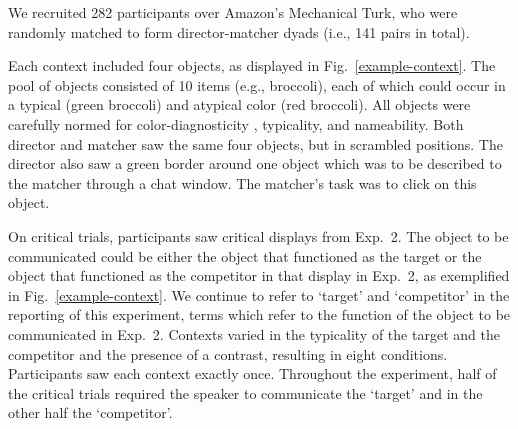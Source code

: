 \documentclass[10pt,letterpaper]{article}
\newcommand{\figref}[1]{Fig.~\ref{#1}}
\begin{document}


We recruited 282 participants over Amazon's Mechanical Turk, who were randomly matched to form director-matcher dyads (i.e., 141 pairs in total). 

Each context included four objects, as displayed in \figref{example-context}. The pool of objects consisted of 10 items (e.g., broccoli), each of which could occur in a typical (green broccoli) and atypical color (red broccoli). All objects were carefully normed for color-diagnosticity \cite{Tanaka:1999}, typicality, and nameability. Both director and matcher saw the same four objects, but in scrambled positions. The director also saw a green border around one object which was to be described to the matcher through a chat window. The matcher's task was to click on this object. 


On critical trials, participants saw critical displays from Exp.~2. The object to be communicated could be either the object that functioned as the target or the object that functioned as the competitor in that display in Exp.~2, as exemplified in \figref{example-context}. We continue to refer to `target' and `competitor' in the reporting of this experiment, terms which refer to the function of the object to be communicated in Exp.~2. Contexts varied in the typicality of the target and the competitor and the presence of a contrast, resulting in eight conditions. Participants saw each context exactly once. Throughout the experiment, half of the critical trials required the speaker to communicate the `target' and in the other half the `competitor'.
\end{document}
